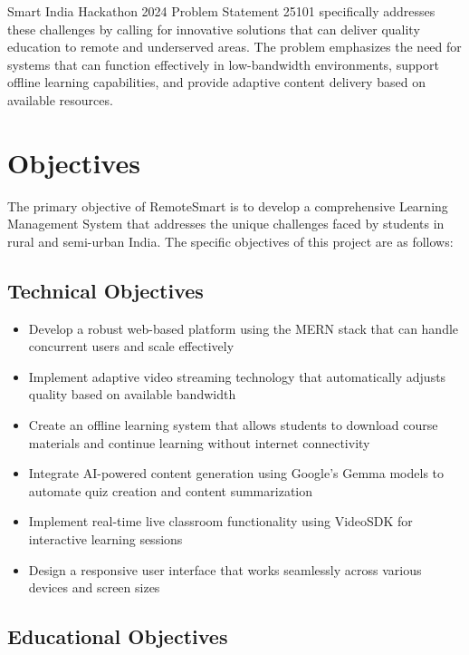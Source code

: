 \documentclass[12pt,a4paper]{report}
\begin{document}
Smart India Hackathon 2024 Problem Statement 25101 specifically addresses these challenges by calling for innovative solutions that can deliver quality education to remote and underserved areas. The problem emphasizes the need for systems that can function effectively in low-bandwidth environments, support offline learning capabilities, and provide adaptive content delivery based on available resources.

\section{Objectives}

The primary objective of RemoteSmart is to develop a comprehensive Learning Management System that addresses the unique challenges faced by students in rural and semi-urban India. The specific objectives of this project are as follows:

\subsection{Technical Objectives}

\begin{itemize}
    \item Develop a robust web-based platform using the MERN stack that can handle concurrent users and scale effectively
    \item Implement adaptive video streaming technology that automatically adjusts quality based on available bandwidth
    \item Create an offline learning system that allows students to download course materials and continue learning without internet connectivity
    \item Integrate AI-powered content generation using Google's Gemma models to automate quiz creation and content summarization
    \item Implement real-time live classroom functionality using VideoSDK for interactive learning sessions
    \item Design a responsive user interface that works seamlessly across various devices and screen sizes
\end{itemize}

\subsection{Educational Objectives}
\end{document}
